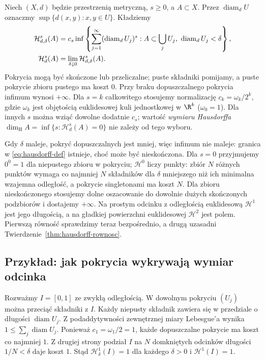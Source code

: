 \begin{definicja}
\label{def:miara-hausdorffa}
Niech $(X,d)$ będzie przestrzenią metryczną,
$s\geq0$, a $A\subset X$.
Przez $\operatorname{diam}_d U$ oznaczmy
$\sup\{d(x,y):x,y\in U\}$. Kładziemy
\begin{align}\label{eq:hausdorff-def}
 \mathcal H^s_{d,\delta}(A)
 &=c_s\inf\left\{
       \sum_{j=1}^{\infty}(\operatorname{diam}_d U_j)^s:
       A\subset\bigcup_j U_j,\
       \operatorname{diam}_d U_j<\delta\right\},\\
 \mathcal H^s_d(A)
 &=\lim_{\delta\downarrow0}
                  \mathcal H^s_{d,\delta}(A).
 \notag
\end{align}
Pokrycia mogą być skończone lub przeliczalne;
puste składniki pomijamy, a puste pokrycie zbioru
pustego ma koszt $0$. Przy braku dopuszczalnego
pokrycia infimum wynosi $+\infty$.
Dla $s=k$ całkowitego stosujemy normalizację
$c_k=\omega_k/2^k$, gdzie $\omega_k$
jest objętością euklidesowej kuli jednostkowej
w $\R^k$ ($\omega_0=1$). Dla innych $s$
można wziąć dowolne dodatnie $c_s$;
wartość \emph{wymiaru Hausdorffa}
$\dim_{\mathrm H}A
=\inf\{s:\mathcal H^s_d(A)=0\}$
nie zależy od tego wyboru.
\end{definicja}

Gdy $\delta$ maleje, pokryć dopuszczalnych
jest mniej, więc infimum nie maleje:
granica w \eqref{eq:hausdorff-def} istnieje,
choć może być nieskończona.
Dla $s=0$ przyjmujemy $0^0=1$ dla
niepustego zbioru w pokryciu;
$\mathcal H^0$ liczy punkty: zbiór $N$ różnych punktów
wymaga co najmniej $N$ składników dla $\delta$ mniejszego
niż ich minimalna wzajemna odległość, a pokrycie
singletonami ma koszt $N$. Dla zbioru nieskończonego
stosujemy dolne oszacowanie do dowolnie dużych
skończonych podzbiorów i dostajemy $+\infty$.
Na prostym odcinku z odległością euklidesową $\mathcal H^1$ jest
jego długością, a na gładkiej powierzchni euklidesowej
$\mathcal H^2$ jest polem. Pierwszą równość sprawdzimy
teraz bezpośrednio, a drugą uzasadni
Twierdzenie~\ref{thm:hausdorff-rownosc}.

\subsection*{Przykład: jak pokrycia wykrywają wymiar odcinka}

Rozważmy $I=[0,1]$ ze zwykłą odległością.
W dowolnym pokryciu $(U_j)$ można przeciąć składniki z $I$.
Każdy niepusty składnik zawiera się w przedziale
o długości $\operatorname{diam}U_j$.
Z podaddytywności zewnętrznej miary Lebesgue'a wynika
$1\leq\sum_j\operatorname{diam}U_j$.
Ponieważ $c_1=\omega_1/2=1$, każde dopuszczalne pokrycie
ma koszt co najmniej $1$.
Z drugiej strony podział $I$ na $N$ domkniętych
odcinków długości $1/N<\delta$ daje koszt $1$.
Stąd $\mathcal H^1_\delta(I)=1$ dla każdego $\delta>0$
i $\mathcal H^1(I)=1$.

